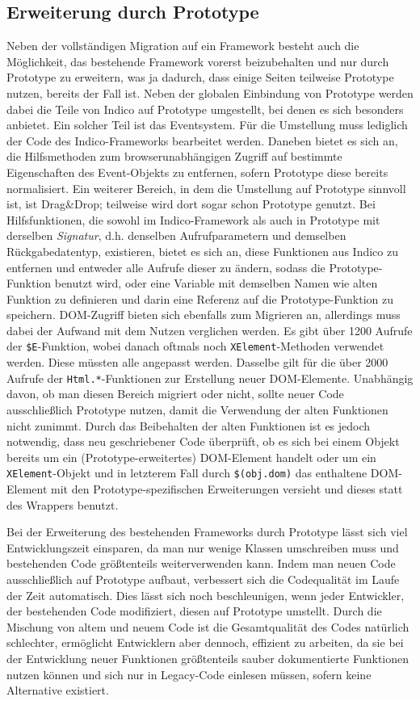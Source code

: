 \subsection{Erweiterung durch Prototype}
Neben der vollständigen Migration auf ein Framework besteht auch die Möglichkeit, das bestehende
Framework vorerst beizubehalten und nur durch Prototype zu erweitern, was ja dadurch, dass einige
Seiten teilweise Prototype nutzen, bereits der Fall ist. Neben der globalen Einbindung von Prototype
werden dabei die Teile von Indico auf Prototype umgestellt, bei denen es sich besonders anbietet. Ein
solcher Teil ist das Eventsystem. Für die Umstellung muss lediglich der Code des Indico-Frameworks
bearbeitet werden. Daneben bietet es sich an, die Hilfsmethoden zum browserunabhängigen Zugriff auf
bestimmte Eigenschaften des Event-Objekts zu entfernen, sofern Prototype diese bereits normalisiert.
Ein weiterer Bereich, in dem die Umstellung auf Prototype sinnvoll ist, ist Drag\&Drop; teilweise
wird dort sogar schon Prototype genutzt. Bei Hilfsfunktionen, die sowohl im Indico-Framework als
auch in Prototype mit derselben \emph{Signatur}, d.h. denselben Aufrufparametern und demselben
Rückgabedatentyp, existieren, bietet es sich an, diese Funktionen aus Indico zu entfernen und
entweder alle Aufrufe dieser zu ändern, sodass die Prototype-Funktion benutzt wird, oder eine
Variable mit demselben Namen wie alten Funktion zu definieren und darin eine Referenz auf die
Prototype-Funktion zu speichern. DOM-Zugriff bieten sich ebenfalls zum Migrieren an, allerdings muss
dabei der Aufwand mit dem Nutzen verglichen werden. Es gibt über 1200 Aufrufe der
\lstinline{$E}-Funktion, wobei danach oftmals noch \lstinline{XElement}-Methoden verwendet werden.
Diese müssten alle angepasst werden. Dasselbe gilt für die über 2000 Aufrufe der
\lstinline{Html.*}-Funktionen zur Erstellung neuer DOM-Elemente. Unabhängig davon, ob man diesen
Bereich migriert oder nicht, sollte neuer Code ausschließlich Prototype nutzen, damit die Verwendung
der alten Funktionen nicht zunimmt. Durch das Beibehalten der alten Funktionen ist es jedoch
notwendig, dass neu geschriebener Code überprüft, ob es sich bei einem Objekt bereits um ein
(Prototype-erweitertes) DOM-Element handelt oder um ein \lstinline{XElement}-Objekt und in letzterem
Fall durch \lstinline{$(obj.dom)} das enthaltene DOM-Element mit den Prototype-spezifischen
Erweiterungen versieht und dieses statt des Wrappers benutzt.

Bei der Erweiterung des bestehenden Frameworks durch Prototype lässt sich viel Entwicklungszeit
einsparen, da man nur wenige Klassen umschreiben muss und bestehenden Code größtenteils
weiterverwenden kann. Indem man neuen Code ausschließlich auf Prototype aufbaut, verbessert sich die
Codequalität im Laufe der Zeit automatisch. Dies lässt sich noch beschleunigen, wenn jeder
Entwickler, der bestehenden Code modifiziert, diesen auf Prototype umstellt. Durch die Mischung von
altem und neuem Code ist die Gesamtqualität des Codes natürlich schlechter, ermöglicht Entwicklern
aber dennoch, effizient zu arbeiten, da sie bei der Entwicklung neuer Funktionen größtenteils sauber
dokumentierte Funktionen nutzen können und sich nur in Legacy-Code einlesen müssen, sofern keine
Alternative existiert.


